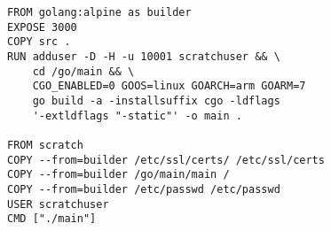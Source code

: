 \lstset{
numbers=left, 
basicstyle=\footnotesize,
frame = single, 
language=Pascal, 
framexleftmargin=16pt,
xleftmargin=2.3cm,
}
\begin{lstlisting}[linewidth=13cm, caption={Dockerfile for the Hello Application},label={lst:dockerfileHello}]
FROM golang:alpine as builder
EXPOSE 3000
COPY src .
RUN adduser -D -H -u 10001 scratchuser && \
    cd /go/main && \
    CGO_ENABLED=0 GOOS=linux GOARCH=arm GOARM=7 
    go build -a -installsuffix cgo -ldflags 
    '-extldflags "-static"' -o main .

FROM scratch
COPY --from=builder /etc/ssl/certs/ /etc/ssl/certs
COPY --from=builder /go/main/main /
COPY --from=builder /etc/passwd /etc/passwd
USER scratchuser
CMD ["./main"]
\end{lstlisting}